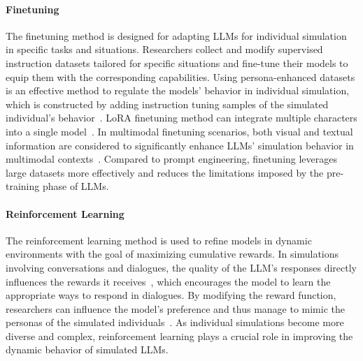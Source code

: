\paragraph{Finetuning} The finetuning method is designed for adapting LLMs for individual simulation in specific tasks and situations. Researchers collect and modify supervised instruction datasets tailored for specific situations and fine-tune their models to equip them with the corresponding capabilities. Using persona-enhanced datasets is an effective method to regulate the models' behavior in individual simulation, which is constructed by adding instruction tuning samples of the simulated individual’s behavior~\cite{ran2024capturingmindsjustwords,ge2024scalingsyntheticdatacreation}. 
LoRA finetuning method can integrate multiple characters into a single model~\cite{yu2024neekoleveragingdynamiclora,sun2024identity}. In multimodal finetuning scenarios, both visual and textual information are considered to significantly enhance LLMs' simulation behavior in multimodal contexts~\cite{salemi2024lamplargelanguagemodels,dai2024mmrolecomprehensiveframeworkdeveloping}. Compared to prompt engineering, finetuning leverages large datasets more effectively and reduces the limitations imposed by the pre-training phase of LLMs.

\paragraph{Reinforcement Learning} The reinforcement learning method is used to refine models in dynamic environments with the goal of maximizing cumulative rewards. In simulations involving conversations and dialogues, the quality of the LLM's responses directly influences the rewards it receives~\cite{bai2022traininghelpfulharmlessassistant,shea2023buildingpersonaconsistentdialogue,jang2023personalizedsoupspersonalizedlarge}, which encourages the model to learn the appropriate ways to respond in dialogues.
By modifying the reward function, researchers can influence the model's preference and thus manage to mimic the personas of the simulated individuals~\cite{chawla2023selfishwiselyinvestigatingimpact}. As individual simulations become more diverse and complex, reinforcement learning plays a crucial role in improving the dynamic behavior of simulated LLMs.

